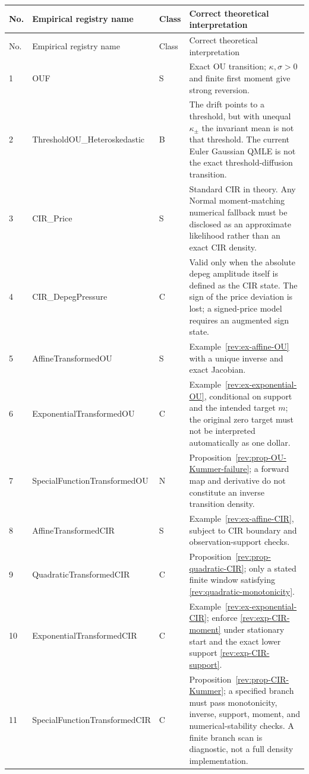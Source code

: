 \documentclass[11pt]{article}
\theoremstyle{remark}
\begin{document}
\scriptsize
\begin{longtable}{p{}p{}p{}p{}}
\toprule
No. & Empirical registry name & Class & Correct theoretical interpretation\\
\midrule
\endfirsthead
\toprule
No. & Empirical registry name & Class & Correct theoretical interpretation\\
\midrule
\endhead
1 & OUF & S & Exact OU transition; $\kappa,\sigma>0$ and finite first moment give strong reversion.\\
2 & ThresholdOU\_\allowbreak{}Heteroskedastic & B & The drift points to a threshold, but with unequal $\kappa_\pm$ the invariant mean is not that threshold.  The current Euler Gaussian QMLE is not the exact threshold-diffusion transition.\\
3 & CIR\_Price & S & Standard CIR in theory.  Any Normal moment-matching numerical fallback must be disclosed as an approximate likelihood rather than an exact CIR density.\\
4 & CIR\_\allowbreak{}DepegPressure & C & Valid only when the absolute depeg amplitude itself is defined as the CIR state.  The sign of the price deviation is lost; a signed-price model requires an augmented sign state.\\
5 & AffineTransformedOU & S & Example~\ref{rev:ex-affine-OU} with a unique inverse and exact Jacobian.\\
6 & Exponential\allowbreak{}TransformedOU & C & Example~\ref{rev:ex-exponential-OU}, conditional on support and the intended target $m$; the original zero target must not be interpreted automatically as one dollar.\\
7 & SpecialFunction\allowbreak{}TransformedOU & N & Proposition~\ref{rev:prop-OU-Kummer-failure}; a forward map and derivative do not constitute an inverse transition density.\\
8 & AffineTransformedCIR & S & Example~\ref{rev:ex-affine-CIR}, subject to CIR boundary and observation-support checks.\\
9 & Quadratic\allowbreak{}TransformedCIR & C & Proposition~\ref{rev:prop-quadratic-CIR}; only a stated finite window satisfying \eqref{rev:quadratic-monotonicity}.\\
10 & Exponential\allowbreak{}TransformedCIR & C & Example~\ref{rev:ex-exponential-CIR}; enforce \eqref{rev:exp-CIR-moment} under stationary start and the exact lower support \eqref{rev:exp-CIR-support}.\\
11 & SpecialFunction\allowbreak{}TransformedCIR & C & Proposition~\ref{rev:prop-CIR-Kummer}; a specified branch must pass monotonicity, inverse, support, moment, and numerical-stability checks.  A finite branch scan is diagnostic, not a full density implementation.\\

\end{longtable}
\end{document}
